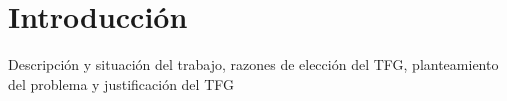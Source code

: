 \chapter{Introducci\'{o}n} 
Descripción y situación del trabajo, razones de elección del TFG, 
planteamiento del problema y justificación del TFG 